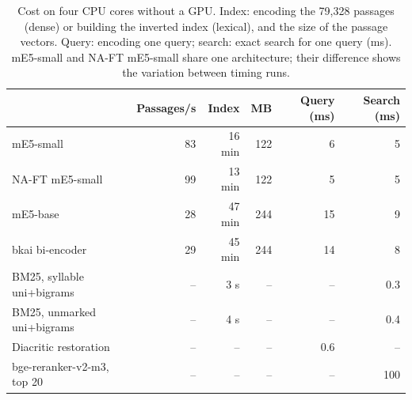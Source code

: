 \begin{table}[t]
\centering
\caption{Cost on four CPU cores without a GPU. Index: encoding the 79,328
passages (dense) or building the inverted index (lexical), and the size of the passage vectors. Query: encoding one
query; search: exact search for one query (ms). mE5-small and NA-FT mE5-small share one architecture; their difference
shows the variation between timing runs.}
\label{tab:efficiency}
\small
\setlength{\tabcolsep}{4pt}
\begin{tabular}{@{}l r r r r r@{}}
\toprule
 & Passages/s & Index & MB & Query (ms) & Search (ms) \\
\midrule
mE5-small & 83 & 16 min & 122 & 6 & 5 \\
NA-FT mE5-small & 99 & 13 min & 122 & 5 & 5 \\
mE5-base & 28 & 47 min & 244 & 15 & 9 \\
bkai bi-encoder & 29 & 45 min & 244 & 14 & 8 \\
\midrule
BM25, syllable uni+bigrams & -- & 3 s & -- & -- & 0.3 \\
BM25, unmarked uni+bigrams & -- & 4 s & -- & -- & 0.4 \\
Diacritic restoration & -- & -- & -- & 0.6 & -- \\
bge-reranker-v2-m3, top 20 & -- & -- & -- & -- & 100 \\
\bottomrule
\end{tabular}
\end{table}
